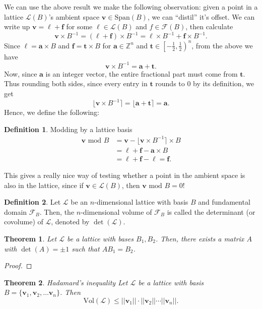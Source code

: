 \documentclass{article}
\newtheorem{theorem}{Theorem}[section]
\theoremstyle{definition}
\newtheorem{definition}{Definition}[section]
\theoremstyle{example}
\newcommand{\Vol}{\text{Vol}}
\renewcommand{\L}{\mathcal{L}}
\newcommand{\F}{\mathcal{F}}
\newcommand{\Int}{\mathbb{Z}}
\newcommand{\Span}{\text{Span}}
\renewcommand{\mod}{\,\,\text{mod}\,\,}
\renewcommand{\vec}[1]{\mathbf{#1}}
\newcommand{\norm}[1]{||#1||}
\begin{document}
We can use the above result we make the following observation: given a point in
a lattice $\L(B)$'s ambient space $\vec{v} \in \Span(B)$, we can ``distil''
it's offset. We can write up $\vec{v} = \ell + \vec{f}$ for some $\ell\in
\L(B)$ and $f \in \F(B)$, then calculate
\[
  \vec{v}\times B^{-1} = (\ell + \vec{f}) \times B^{-1} = \ell\times B^{-1} +
  \vec{f}\times B^{-1}.
\]
Since $\ell = \vec{a} \times B$ and $\vec{f} = \vec{t} \times B$ for $\vec{a}
\in \Int^n$ and $\vec{t} \in \left[-\frac12, \frac12\right)^n$, from the above we have
\[
  \vec{v}\times B^{-1} = \vec{a} + \vec{t}.
\]
Now, since $\vec{a}$ is an integer vector, the entire fractional part must come
from $\vec{t}$. Thus rounding both sides, since every entry in $\vec{t}$ rounds
to 0 by its definition, we get
\[
  \lfloor \vec{v}\times B^{-1} \rceil = \lfloor \vec{a} + \vec{t} \rceil = \vec{a}.
\]
Hence, we define the following:
\begin{definition}{Modding by a lattice basis}
  \label{def:lattice_mod}
  \begin{align*}
    \vec{v} \mod B &= \vec{v} - \lfloor \vec{v} \times B^{-1} \rceil \times B \\
                   &= \ell + \vec{f} - \vec{a} \times B \\
                   &= \ell + \vec{f} - \ell = \vec{f}.
  \end{align*}
\end{definition}
This gives a really nice way of testing whether a point in the ambient space is
also in the lattice, since if $\vec{v} \in \L(B)$, then $\vec{v} \mod B = 0$!
\begin{definition}
  Let $\L$ be an $n$-dimensional lattice with basis $B$ and fundamental domain
  $\F_B$. Then, the $n$-dimensional volume of $\F_B$ is called the determinant
  (or covolume) of $\L$, denoted by $\det(\L)$.
\end{definition}
\begin{theorem}
  \label{thm:lattice_change_of_basis}
  Let $\L$ be a lattice with bases $B_1, B_2$. Then, there exists a matrix $A$
  with $\det(A) = \pm 1$ such that $AB_1 = B_2$.
\end{theorem}
\begin{proof}
\end{proof}
\begin{theorem}{Hadamard's inequality}
  Let $\L$ be a lattice with basis $B = \{\vec{v}_1, \vec{v}_2, \hdots \vec{v}_n\}$. Then
\[
  \Vol(\L) \leq \norm{\vec{v}_1}\cdot\norm{\vec{v}_2}\cdots\norm{\vec{v}_n}.
\]
\end{theorem}
\end{document}
